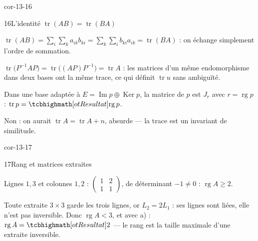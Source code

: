 \begin{blocLivre}{cor-13-16}
\begin{corrige}{16}{L'identité $\operatorname{tr}(AB)=\operatorname{tr}(BA)$}
\begin{questions}
  \item $\operatorname{tr}(AB)=\sum_{i}\sum_{k}a_{ik}b_{ki}
    =\sum_{k}\sum_{i}b_{ki}a_{ik}=\operatorname{tr}(BA)$ : on échange
    simplement l'ordre de sommation.
  \item $\operatorname{tr}\bigl(P^{-1}AP\bigr)
    =\operatorname{tr}\bigl((AP)P^{-1}\bigr)=\operatorname{tr}A$ : les
    matrices d'un même endomorphisme dans deux bases ont la même trace,
    ce qui définit $\operatorname{tr}u$ sans ambiguïté.
  \item Dans une base adaptée à
    $E=\operatorname{Im}p\oplus\operatorname{Ker}p$, la matrice de $p$
    est $J_r$ avec $r=\operatorname{rg}p$ :
    $\operatorname{tr}p=\res{\operatorname{rg}p}$.
  \item Non : on aurait $\operatorname{tr}A=\operatorname{tr}A+n$, absurde
    — la trace est un invariant de similitude.
\end{questions}
\end{corrige}
\end{blocLivre}

\begin{blocLivre}{cor-13-17}
\begin{corrige}{17}{Rang et matrices extraites}
\begin{questions}
  \item Lignes $1,3$ et colonnes $1,2$ :
    $\begin{pmatrix}1&2\\1&1\end{pmatrix}$, de déterminant $-1\neq0$ :
    $\operatorname{rg}A\geqslant2$.
  \item Toute extraite $3\times3$ garde les trois lignes, or $L_2=2L_1$ :
    ses lignes sont liées, elle n'est pas inversible. Donc
    $\operatorname{rg}A<3$, et avec a) : $\operatorname{rg}A=\res{2}$ —
    le rang est la taille maximale d'une extraite inversible.
\end{questions}
\end{corrige}
\end{blocLivre}

